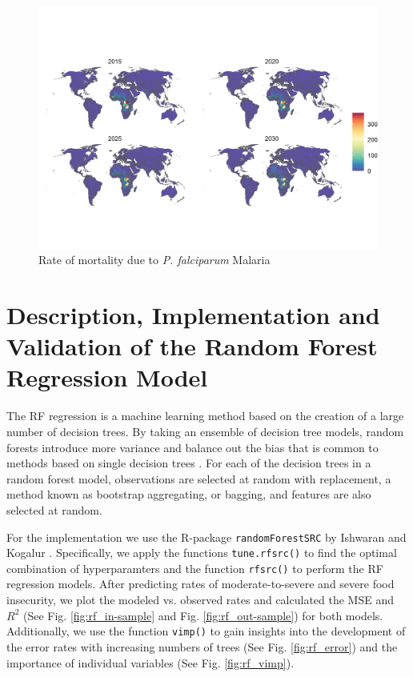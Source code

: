 \documentclass{article}
\begin{document}
\begin{figure}[H]
  \centering
  \includegraphics[width=\linewidth]{img/covars/mal_falciparum.png}
  \caption{Rate of mortality due to \textit{P. falciparum} Malaria}
\end{figure}

\pagebreak
\section{Description, Implementation and Validation of the Random Forest Regression Model}
The RF regression is a machine learning method based on the creation of a large number of decision trees. By taking an ensemble of decision tree models, random forests introduce more variance and balance out the bias that is common to methods based on single decision trees \citep{friedman2001elements}.  For each of the decision trees in a random forest model, observations are selected at random with replacement, a method known as bootstrap aggregating, or bagging, and features are also selected at random.

For the implementation we use the R-package \texttt{randomForestSRC} by Ishwaran and Kogalur \citep{ishwaran2019randomforestsrc}. Specifically, we apply the functions \texttt{tune.rfsrc()} to find the optimal combination of hyperparamters and the function \texttt{rfsrc()} to perform the RF regression models. After predicting rates of moderate-to-severe and severe food insecurity, we plot the modeled vs. observed rates and calculated the MSE and ${R}^2$ (See Fig. \ref{fig:rf_in-sample} and Fig. \ref{fig:rf_out-sample}) for both models. Additionally, we use the function \texttt{vimp()} to gain insights into the development of the error rates with increasing numbers of trees (See Fig. \ref{fig:rf_error}) and the importance of individual variables (See Fig. \ref{fig:rf_vimp}).
\end{document}
